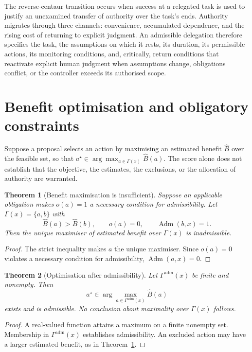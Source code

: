 \documentclass[11pt]{article}
\newtheorem{theorem}{Theorem}
\theoremstyle{definition}
\theoremstyle{remark}
\newcommand{\Adm}{\operatorname{Adm}}
\begin{document}
The reverse-centaur transition occurs when success at a relegated task is used to justify an unexamined transfer of authority over the task's ends. Authority migrates through three channels: convenience, accumulated dependence, and the rising cost of returning to explicit judgment. An admissible delegation therefore specifies the task, the assumptions on which it rests, its duration, its permissible actions, its monitoring conditions, and, critically, return conditions that reactivate explicit human judgment when assumptions change, obligations conflict, or the controller exceeds its authorised scope.

\section{Benefit optimisation and obligatory constraints}

Suppose a proposal selects an action by maximising an estimated benefit $\widehat B$ over the feasible set, so that $a^\star\in\arg\max_{a\in\Gamma(x)}\widehat B(a)$. The score alone does not establish that the objective, the estimates, the exclusions, or the allocation of authority are warranted.

\begin{theorem}[Benefit maximisation is insufficient]\label{thm:benefit}
Suppose an applicable obligation makes $o(a)=1$ a necessary condition for admissibility. Let $\Gamma(x)=\{a,b\}$ with
\[
\widehat B(a)>\widehat B(b),\qquad o(a)=0,\qquad \Adm(b,x)=1.
\]
Then the unique maximiser of estimated benefit over $\Gamma(x)$ is inadmissible.
\end{theorem}
\begin{proof}
The strict inequality makes $a$ the unique maximiser. Since $o(a)=0$ violates a necessary condition for admissibility, $\Adm(a,x)=0$. \qedhere
\end{proof}

\begin{theorem}[Optimisation after admissibility]\label{thm:optadm}
Let $\Gamma^{\mathrm{adm}}(x)$ be finite and nonempty. Then
\[
a^\star\in\arg\max_{a\in\Gamma^{\mathrm{adm}}(x)}\widehat B(a)
\]
exists and is admissible. No conclusion about maximality over $\Gamma(x)$ follows.
\end{theorem}
\begin{proof}
A real-valued function attains a maximum on a finite nonempty set. Membership in $\Gamma^{\mathrm{adm}}(x)$ establishes admissibility. An excluded action may have a larger estimated benefit, as in Theorem~\ref{thm:benefit}. \qedhere
\end{proof}
\end{document}
